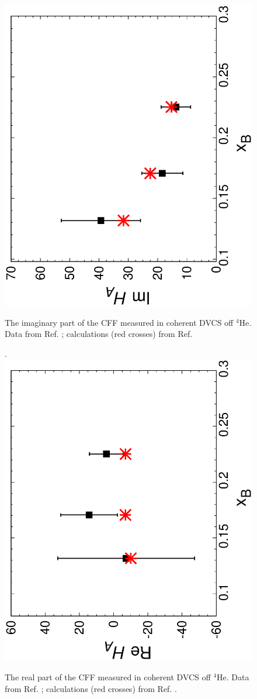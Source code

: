 \documentclass[times, twoside]{PosWhiPap}
\begin{document}
\begin{figure}[tbhp]
\centering
\includegraphics[width=.7\linewidth, angle=270]{Figures/imxb.eps}
\caption{The imaginary part of the CFF measured in coherent DVCS off $^4$He.
Data from Ref. \cite{Hattawy:2017woc}; calculations (red crosses) from
Ref. \cite{Fucini:2018gso}}.
\label{uno}
\includegraphics[width=.7\linewidth, angle=270]{Figures/rexb.eps}
\caption{
The real part of the CFF measured in coherent DVCS off $^4$He.
Data from Ref. \cite{Hattawy:2017woc}; calculations (red crosses) from
Ref. \cite{Fucini:2018gso}.
}
\label{due}
\end{figure}
\end{document}
